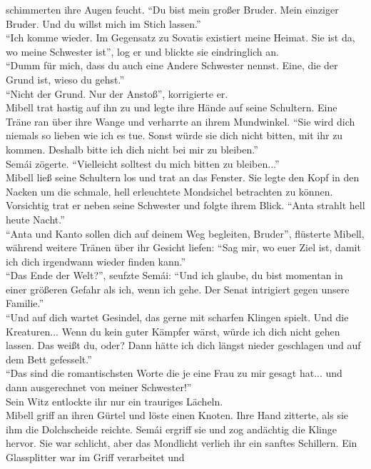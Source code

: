 schimmerten ihre Augen feucht. ``Du bist mein großer Bruder. Mein einziger Bruder. Und du willst 
mich im Stich lassen.''\\
``Ich komme wieder. Im Gegensatz zu Sovatis existiert meine Heimat. Sie ist da, wo meine Schwester 
ist'', log er und blickte sie eindringlich an.\\
``Dumm für mich, dass du auch eine Andere Schwester nennst. Eine, die der Grund ist, wieso du 
gehst.''\\
``Nicht der Grund. Nur der Anstoß'', korrigierte er.\\
Mibell trat hastig auf ihn zu und legte ihre Hände auf seine Schultern. Eine Träne ran über ihre 
Wange und verharrte an ihrem Mundwinkel. ``Sie wird dich niemals so lieben wie ich es tue. Sonst 
würde sie dich nicht bitten, mit ihr zu kommen. Deshalb bitte ich dich nicht bei mir zu bleiben.''\\
Semái zögerte. ``Vielleicht solltest du mich bitten zu bleiben...''\\
Mibell ließ seine Schultern los und trat an das Fenster. Sie legte den Kopf in den Nacken um die 
schmale, hell erleuchtete Mondsichel betrachten zu können. Vorsichtig trat er neben seine Schwester 
und folgte ihrem Blick. ``Anta strahlt hell heute Nacht.''\\
``Anta und Kanto sollen dich auf deinem Weg begleiten, Bruder'', flüsterte Mibell, während weitere 
Tränen über ihr Gesicht liefen: ``Sag mir, wo euer Ziel ist, damit ich dich irgendwann wieder 
finden kann.''\\
``Das Ende der Welt?'', seufzte Semái: ``Und ich glaube, du bist momentan in einer größeren Gefahr 
als ich, wenn ich gehe. Der Senat intrigiert gegen unsere Familie.''\\
``Und auf dich wartet Gesindel, das gerne mit scharfen Klingen spielt. Und die Kreaturen... Wenn du 
kein guter Kämpfer wärst, würde ich dich nicht gehen lassen. Das weißt du, oder? Dann hätte ich dich 
längst nieder geschlagen und auf dem Bett gefesselt.''\\
``Das sind die romantischsten Worte die je eine Frau zu mir gesagt hat... und dann ausgerechnet von 
meiner Schwester!''\\
Sein Witz entlockte ihr nur ein trauriges Lächeln. \\
Mibell griff an ihren Gürtel und löste einen Knoten. Ihre Hand zitterte, als sie ihm die 
Dolchscheide reichte. Semái ergriff sie und zog andächtig die Klinge hervor. Sie war schlicht, aber 
das Mondlicht verlieh ihr ein sanftes Schillern. Ein Glassplitter war im Griff verarbeitet und 
